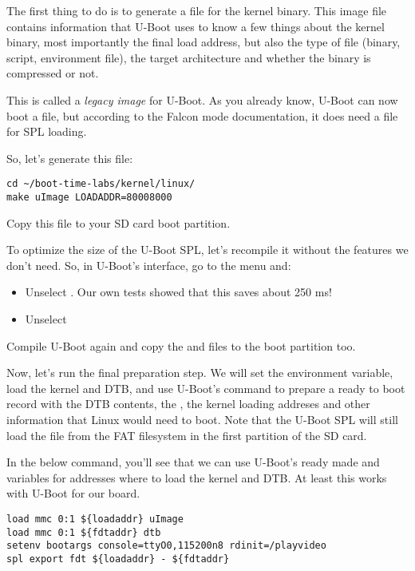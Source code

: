 The first thing to do is to generate a  file for the kernel
binary. This image file contains information that U-Boot uses to know a
few things about the kernel binary, most importantly the final load
address, but also the type of file (binary, script, environment file),
the target architecture and whether the binary is compressed or not.

This is called a {\em legacy image} for U-Boot. As you already know,
U-Boot can now boot a  file, but according to the Falcon
mode documentation, it does need a  file for SPL loading.

So, let's generate this file:
\begin{verbatim}
cd ~/boot-time-labs/kernel/linux/
make uImage LOADADDR=80008000
\end{verbatim}

Copy this  file to your SD card boot partition.

To optimize the size of the U-Boot SPL, let's recompile it without the
features we don't need. So, in U-Boot's  interface,
go to the  menu and:

\begin{itemize}
\item Unselect . Our own tests showed that this
      saves about 250 ms!
\item Unselect 
\end{itemize}

Compile U-Boot again
and copy the  and  files to the boot
partition too.

Now, let's run the final preparation step. We will set the
 environment variable, load the kernel and DTB, and
use U-Boot's  command to prepare a ready to boot record
with the DTB contents, the , the kernel loading addreses
and other information that Linux would need to boot. Note that the
U-Boot SPL will still load the  file from the FAT
filesystem in the first partition of the SD card.

In the below command, you'll see that we can use U-Boot's ready made
 and  variables for addresses where to load
the kernel and DTB. At least this works with U-Boot for our board.

\begin{verbatim}
load mmc 0:1 ${loadaddr} uImage
load mmc 0:1 ${fdtaddr} dtb
setenv bootargs console=ttyO0,115200n8 rdinit=/playvideo
spl export fdt ${loadaddr} - ${fdtaddr}
\end{verbatim}

